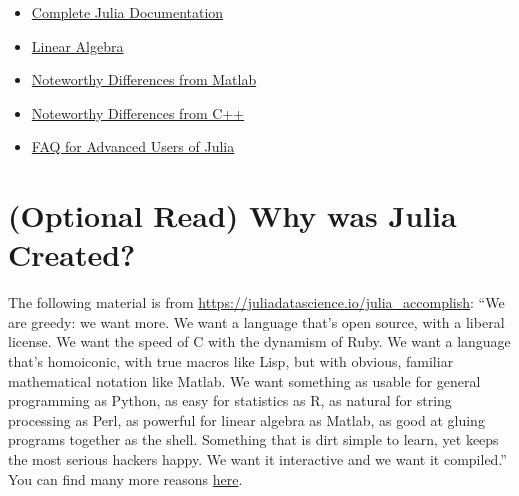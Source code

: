 \begin{itemize}

    \item \href{https://web.mit.edu/julia_v0.6.2/julia/share/doc/julia/html/en/index.html}{Complete Julia Documentation}

    \item \href{https://web.mit.edu/julia_v0.6.2/julia/share/doc/julia/html/en/manual/linear-algebra.html#Linear-algebra-1}{Linear Algebra}
    \item  \href{https://web.mit.edu/julia_v0.6.2/julia/share/doc/julia/html/en/manual/noteworthy-differences.html#Noteworthy-differences-from-MATLAB-1}{Noteworthy Differences from Matlab}
     \item  \href{https://web.mit.edu/julia_v0.6.2/julia/share/doc/julia/html/en/manual/noteworthy-differences.html#Noteworthy-differences-from-C/C-1}{Noteworthy Differences from C++}

     \item \href{https://web.mit.edu/julia_v0.6.2/julia/share/doc/julia/html/en/manual/faq.html}{FAQ for Advanced Users of Julia}
\end{itemize}


\section{(Optional Read) Why was Julia Created?}


The following material is from \url{https://juliadatascience.io/julia_accomplish}: 
``We are greedy: we want more. We want a language that’s open source, with a liberal license. We want the speed of C with the dynamism of Ruby. We want a language that’s homoiconic, with true macros like Lisp, but with obvious, familiar mathematical notation like Matlab. We want something as usable for general programming as Python, as easy for statistics as R, as natural for string processing as Perl, as powerful for linear algebra as Matlab, as good at gluing programs together as the shell. Something that is dirt simple to learn, yet keeps the most serious hackers happy. We want it interactive and we want it compiled.''\\

You can find many more reasons \href{https://web.mit.edu/julia_v0.6.2/julia/share/doc/julia/html/en/manual/introduction.html#man-introduction-1}{here}.




